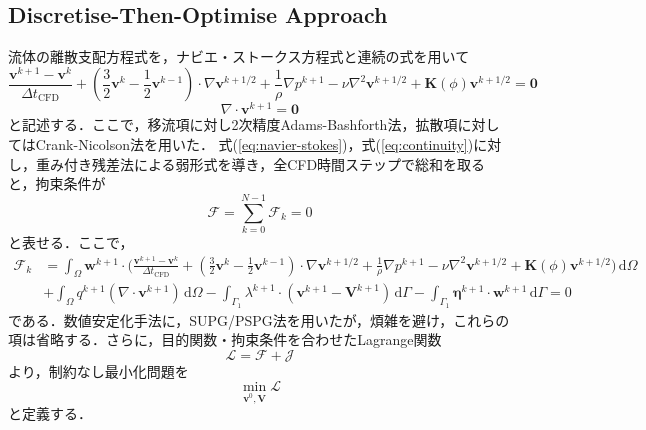 \documentclass[a4paper,xelatex,ja=standard]{bxjsarticle}
\begin{document}
\subsection{Discretise-Then-Optimise Approach}
流体の離散支配方程式を，ナビエ・ストークス方程式と連続の式を用いて
\begin{equation}
    \label{eq:navier-stokes}
    \frac{\mathbf{v}^{k+1}-\mathbf{v}^k}{\Delta t_{\text{CFD}}} + \left( \frac{3}{2}\mathbf{v}^k - \frac{1}{2}\mathbf{v}^{k-1} \right) \cdot \nabla \mathbf{v}^{k+1 / 2} + \frac{1}{\rho} \nabla p^{k+1} - \nu \nabla^2 \mathbf{v}^{k+1/2} + \mathbf{K}(\phi) \mathbf{v}^{k+1/2} = \mathbf{0}
\end{equation}
\begin{equation}
    \label{eq:continuity}
    \nabla \cdot \mathbf{v}^{k+1}=\mathbf{0}
\end{equation}
と記述する．ここで，移流項に対し2次精度Adams-Bashforth法，拡散項に対してはCrank-Nicolson法を用いた．
式(\ref{eq:navier-stokes})，式(\ref{eq:continuity})に対し，重み付き残差法による弱形式を導き，全CFD時間ステップで総和を取ると，拘束条件が
\begin{equation}
    \label{eq:weak-form}
    \mathcal{F}=\sum_{k=0}^{N-1} \mathcal{F}_{k} = 0
\end{equation}
と表せる．ここで，
\begin{equation}
    \label{eq:weak-form-k}
    \begin{aligned}
        \mathcal{F}_{k} & = \int_{\Omega} \mathbf{w}^{k+1} \cdot \bigg( \frac{\mathbf{v}^{k+1}-\mathbf{v}^k}{\Delta t_{\text{CFD}}} +\left( \frac{3}{2}\mathbf{v}^k - \frac{1}{2}\mathbf{v}^{k-1} \right) \cdot \nabla \mathbf{v}^{k+1 / 2} + \frac{1}{\rho} \nabla p^{k+1} - \nu \nabla^2 \mathbf{v}^{k+1/2} + \mathbf{K}(\phi) \mathbf{v}^{k+1/2} \bigg) \, \mathrm{d}\Omega \\
        &+ \int_{\Omega} q^{k+1}(\nabla \cdot \mathbf{v}^{k+1}) \, \mathrm{d}\Omega - \int_{\Gamma_1} \lambda^{k+1} \cdot (\mathbf{v}^{k+1} - \mathbf{V}^{k+1}) \, \mathrm{d}\Gamma - \int_{\Gamma_1} \boldsymbol{\eta}^{k+1} \cdot \mathbf{w}^{k+1} \, \mathrm{d}\Gamma = 0
    \end{aligned}
\end{equation}
である．数値安定化手法に，SUPG/PSPG法を用いたが，煩雑を避け，これらの項は省略する．さらに，目的関数・拘束条件を合わせたLagrange関数
\begin{equation}
    \label{eq:lagrange}
    \mathcal{L} = \mathcal{F} + \mathcal{J}
\end{equation}
より，制約なし最小化問題を
\begin{equation}
    \label{eq:minimization}
    \min_{\mathbf{v}^{0}, \mathbf{V}} \mathcal{L}
\end{equation}
と定義する．
\end{document}
